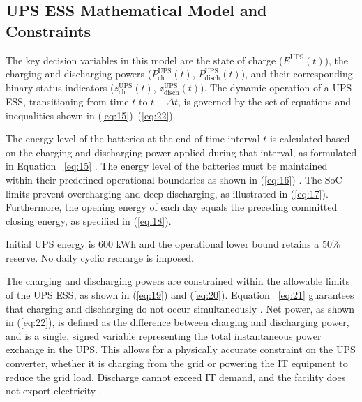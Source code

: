 \documentclass[lettersize,journal]{IEEEtran}
\providecommand{\DIFadd}[1]{{\color{blue}#1}}
\providecommand{\DIFaddbegin}{}
\providecommand{\DIFaddend}{}
\begin{document}
\subsection{UPS ESS Mathematical Model and Constraints}\DIFaddbegin \label{sec:ups-model}

\DIFaddend 

 The key decision variables in this model are the state of charge ($E^{\mathrm{UPS}}(t)$), the charging and discharging powers ($P^{\mathrm{UPS}}_{\mathrm{ch}}(t)$, $P^{\mathrm{UPS}}_{\mathrm{disch}}(t)$), and their corresponding binary status indicators ($z^{\mathrm{UPS}}_{\mathrm{ch}}(t)$, $z^{\mathrm{UPS}}_{\mathrm{disch}}(t)$). The dynamic operation of a UPS ESS, transitioning from time \(t\) to \(t+\Delta t\), is governed by the set of equations and inequalities shown in (\ref{eq:15})--(\ref{eq:22}).

The energy level of the batteries at the end of time interval \(t\) is calculated based on the charging and discharging power applied during that interval, as formulated in Equation \DIFaddbegin \DIFadd{~\eqref{eq:15} }\DIFaddend \cite{Takci2024Chapter}.
The energy level of the batteries must be maintained within their predefined operational boundaries as shown in (\ref{eq:16}) \cite{Takci2024Chapter}. The SoC limits prevent overcharging and deep discharging, as illustrated in (\ref{eq:17}). Furthermore,  the  \DIFaddbegin \DIFadd{opening energy of each day equals the preceding committed closing energy}\DIFaddend , as specified in (\ref{eq:18}). \DIFaddbegin \DIFadd{Initial UPS energy is 600 kWh and the operational lower bound retains a 50\% reserve. No daily cyclic recharge is imposed.

}\DIFaddend 

The charging and discharging powers are constrained within the allowable limits of the UPS ESS, as shown in (\ref{eq:19}) and (\ref{eq:20}). Equation \DIFaddbegin \DIFadd{~\eqref{eq:21} }\DIFaddend guarantees that charging and discharging do not occur simultaneously \cite{Takci2024Chapter}. Net  \DIFaddbegin \DIFadd{power}\DIFaddend , as shown in (\ref{eq:22}), is defined as the difference between charging and discharging power, and is a single, signed variable representing the total instantaneous power exchange in the UPS. This allows for a physically accurate constraint on the UPS converter, whether it is charging from the grid  or powering the IT equipment to reduce the grid load. \DIFaddbegin \DIFadd{Discharge cannot exceed IT demand, and the facility does not export electricity }\DIFaddend \cite{Hashmi2024ArXiv}.
\end{document}
